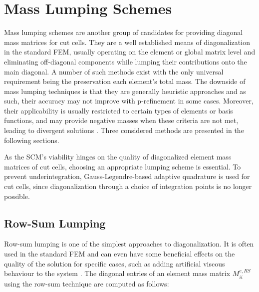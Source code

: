 %
\section{Mass Lumping Schemes}
\label{section:masslumpingschemes}
%

Mass lumping schemes are another group of candidates for providing diagonal mass
matrices for cut cells. They are a well established means of diagonalization
in the standard FEM, usually operating on the element or global matrix level
and eliminating off-diagonal components while lumping their contributions onto the
main diagonal. A number of such methods exist with the only universal requirement
being the preservation each element's total mass. The downside of mass lumping
techniques is that they are generally heuristic approaches and as such, their
accuracy may not improve with p-refinement in some cases. Moreover, their applicability is usually
restricted to certain types of elements or basis functions, and may provide negative
masses when these criteria are not met, leading to divergent solutions \cite{Duczek2019}. Three considered
methods are presented in the following sections.

As the SCM's viability hinges on the quality of diagonalized element mass matrices
of cut cells, choosing an appropriate lumping scheme is essential. To prevent underintegration, Gauss-Legendre-based adaptive quadrature is used for cut cells, since diagonalization through a choice of integration points is no longer possible.

%
\subsection{Row-Sum Lumping}
\label{section:rowsumlumping}
%

Row-sum lumping is one of the simplest approaches to diagonalization.
It is often used in the standard FEM and can even have some beneficial effects on the quality
of the solution for specific cases, such as adding artificial viscous behaviour to the system \cite{Hughes2000}.
The diagonal entries of an element mass matrix $M_{ii}^{e,RS}$ using the row-sum technique are computed as follows:

